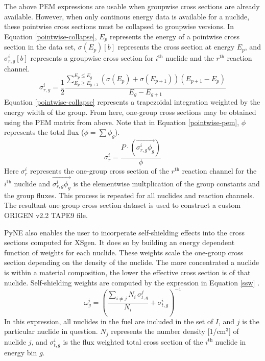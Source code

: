 \documentclass{article}
\begin{document}
The above PEM expressions are usable when groupwise cross sections are already available.
However, when only continous energy data is available for a nuclide, these pointwise
cross sections must be collapsed to groupwise versions.
In Equation \ref{pointwise-collapse}, $E_p$ represents the energy of a pointwise cross section
in the data set,
$\sigma(E_p)[b]$ represents the cross section at energy $E_p$, and $\sigma_{r,g}^i[b]$ represents a
groupwise cross section for $i^\mathrm{th}$ nuclide and the $r^\mathrm{th}$ reaction channel.
\begin{equation}
\label{pointwise-collapse}
\sigma_{r,g}^i = \frac{1}{2} \frac{\sum_{E_p\ge E_{g+1}}^{E_p\le E_g}
                                   \left(\sigma(E_p)+\sigma(E_{p+1})\right)
                                   \left(E_{p+1}-E_{p}\right)}
                                  {E_g-E_{g+1}}
\end{equation}
Equation \ref{pointwise-collapse} represents a trapezoidal integration weighted by the
energy width of the group. From here, one-group cross sections may be obtained using the PEM
matrix from above. Note that in Equation \ref{pointwise-pem}, $\phi$ represents the total
flux ($\phi=\sum\phi_g$).
\begin{equation}
\label{pointwise-pem}
\sigma_{r}^i=\frac{P \cdot (\overrightarrow{\sigma_{r,g}^i \phi_g})}{\phi}
\end{equation}
Here $\sigma_{r}^i$ represents the one-group cross section of the $r^\mathrm{th}$ reaction
channel for the $i^\mathrm{th}$ nuclide and $\overrightarrow{\sigma_{r,g}^i \phi_g}$ is the
elementwise multplication of the group constants and the group fluxes.
This process is repeated for all nuclides and reaction channels. The resultant one-group
cross section dataset is used to construct a custom ORIGEN v2.2 TAPE9 file\cite{origen2}.

PyNE also enables the user to incorperate self-shielding effects \cite{bondarenko} into the cross sections
computed for XSgen. It does so by building an energy dependent function of weights for each
nuclide. These weights scale the one-group cross section depending on the density of the
nuclide. The more concentrated a nuclide is within a material composition, the lower the
effective cross section is of that nuclide. Self-shielding weights are computed by the
expression in Equation \ref{ssw} \cite{weights}.
\begin{equation}
\label{ssw}
\omega_{g}^i=\left(\frac{\sum_{i\neq j}N_i \, \sigma_{t,g}^j}{N_i}+\sigma_{t,g}^i\right)^{-1}
\end{equation}
In this expression, all nuclides in the fuel are included in the set of $I$, and $j$ is
the particular nuclide in question. $N_j$ represents the number density [1/cm$^3$] of
nuclide $j$, and $\sigma_{t,g}^i$ is the flux weighted total cross section of
the $i^\mathrm{th}$ nuclide in energy bin $g$.
\end{document}
